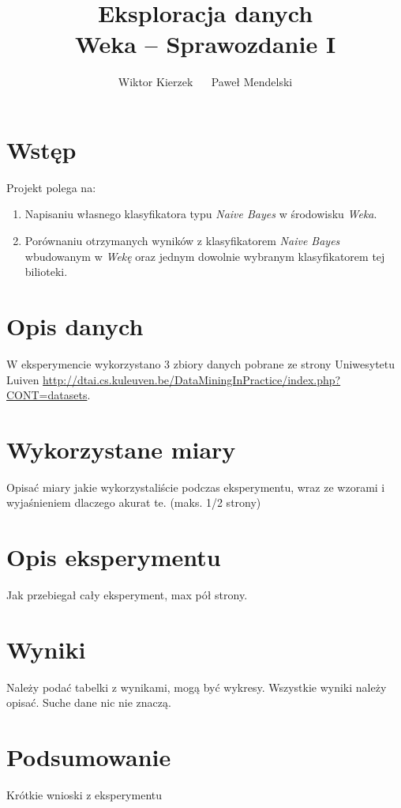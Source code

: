\documentclass[a4paper,11pt]{article}
\author{Wiktor Kierzek $\quad$ Paweł Mendelski}
\title{Eksploracja danych \\ 
\large{\bf Weka -- Sprawozdanie I}}
\begin{document}
 

\maketitle 
 
\section{Wstęp}
 
Projekt polega na:
\begin{enumerate}
	\item Napisaniu własnego klasyfikatora typu \textit{Naive Bayes} w środowisku \textit{Weka}.
	\item Porównaniu otrzymanych wyników z klasyfikatorem \textit{Naive Bayes} wbudowanym w \textit{Wekę} oraz jednym dowolnie wybranym klasyfikatorem tej bilioteki.
\end{enumerate}

\section{Opis danych}

W eksperymencie wykorzystano 3 zbiory danych pobrane ze strony Uniwesytetu Luiven \url{http://dtai.cs.kuleuven.be/DataMiningInPractice/index.php?CONT=datasets}. 

\section{Wykorzystane miary}
Opisać miary jakie wykorzystaliście podczas eksperymentu, wraz ze wzorami i wyjaśnieniem dlaczego akurat te.
(maks. 1/2 strony)


\section{Opis eksperymentu}
Jak przebiegał cały eksperyment, max pół strony.

\section{Wyniki}
Należy podać tabelki z wynikami, mogą być wykresy. Wszystkie wyniki należy opisać. Suche dane nic nie znaczą.

\section{Podsumowanie}
Krótkie wnioski z eksperymentu
\end{document}
